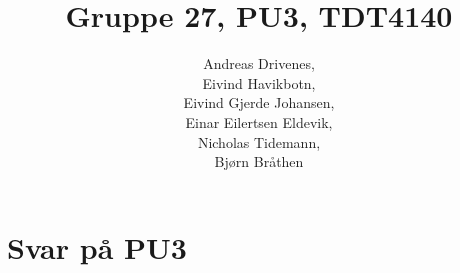 \documentclass[english, a4paper]{article}
\title{Gruppe 27, PU3, TDT4140}
\author{	Andreas Drivenes,\\
		Eivind Havikbotn,\\
		Eivind Gjerde Johansen,\\
		Einar Eilertsen Eldevik,\\
		Nicholas Tidemann,\\
		Bjørn Bråthen\\
}
\begin{document}

\maketitle

\section{Svar på PU3}







\end{document}
